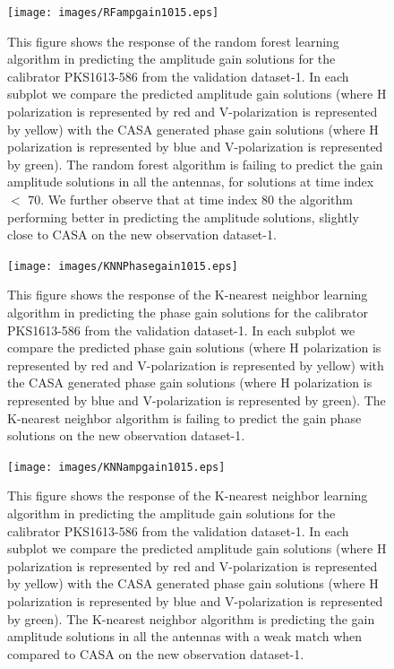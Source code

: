\begin{figure}[H]
    \texttt{[image: images/RFampgain1015.eps]}
    \caption{This figure shows the response of the random forest learning algorithm in predicting the amplitude gain solutions for the calibrator PKS1613-586 from the validation dataset-1. In each subplot we compare the predicted amplitude gain solutions (where H polarization is represented by red and V-polarization is represented by yellow) with the CASA generated phase gain solutions (where H polarization is represented by blue and V-polarization is represented by green). The random forest algorithm is failing to predict the gain amplitude solutions in all the antennas, for solutions at time index $<$ 70. We further observe that at time index $80$ the algorithm performing better in predicting the amplitude solutions, slightly close to CASA on the new observation dataset-1.}
     \label{ra2}
\end{figure}

\begin{figure}[H]
    \texttt{[image: images/KNNPhasegain1015.eps]}
    \caption{This figure shows the response of the K-nearest neighbor learning algorithm in predicting the phase gain solutions for the calibrator PKS1613-586 from the validation dataset-1. In each subplot we compare the predicted phase gain solutions (where H polarization is represented by red and V-polarization is represented by yellow) with the CASA generated phase gain solutions (where H polarization is represented by blue and V-polarization is represented by green). The K-nearest neighbor algorithm is failing to predict the gain phase solutions on the new observation dataset-1.}
    \label{obs7}
\end{figure}

\begin{figure}[H]
    \texttt{[image: images/KNNampgain1015.eps]}
    \caption{This figure shows the response of the K-nearest neighbor learning algorithm in predicting the amplitude gain solutions for the calibrator PKS1613-586 from the validation dataset-1. In each subplot we compare the predicted amplitude gain solutions (where H polarization is represented by red and V-polarization is represented by yellow) with the CASA generated phase gain solutions (where H polarization is represented by blue and V-polarization is represented by green). The K-nearest neighbor algorithm is predicting the gain amplitude solutions in all the antennas with a weak match when compared to CASA on the new observation dataset-1.}
     \label{ka2}
\end{figure}

